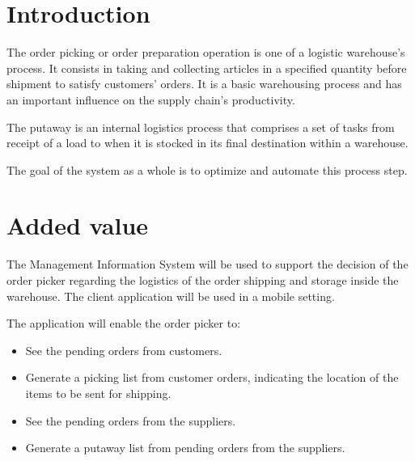 \documentclass[a4paper]{article}
\begin{document}

\newpage

\tableofcontents

\newpage



\section{Introduction}

The order picking or order preparation operation is one of a logistic warehouse's process. It consists in taking and collecting articles in a specified quantity before shipment to satisfy customers' orders. It is a basic warehousing process and has an important influence on the supply chain's productivity.

The putaway is an internal logistics process that comprises a set of tasks from receipt of a load to when it is stocked in its final destination within a warehouse.

The goal of the system as a whole is to optimize and automate this process step.

\newpage

\section{Added value}

The Management Information System will be used to support the decision of the order picker regarding the logistics of the order shipping and storage inside the warehouse. The client application will be used in a mobile setting.

The application will enable the order picker to:

\begin{itemize}
	\item See the pending orders from customers.
	\item Generate a picking list from customer orders, indicating the location of the items to be sent for shipping.
	\item See the pending orders from the suppliers.
	\item Generate a putaway list from pending orders from the suppliers.
\end{itemize}
\end{document}
